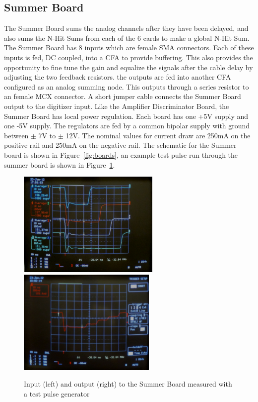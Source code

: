\documentclass{JINST}
\begin{document}
\subsection{Summer Board}
\label{sec:Sum}
%
The Summer Board sums the analog channels after they have been
delayed, and also sums the N-Hit Sums from each of the 6 cards to make
a global N-Hit Sum.  The Summer Board has 8 inputs which are female
SMA connectors.  Each of these inputs is fed, DC coupled, into a CFA
to provide buffering.  This also provides the opportunity to fine tune
the gain and equalize the signals after the cable delay by adjusting
the two feedback resistors.  the outputs are fed into another CFA
configured as an analog summing node.  This outputs through a series
resistor to an female MCX connector.  A short jumper cable connects
the Summer Board output to the digitizer input.  Like the Amplifier
Discriminator Board, the Summer Board has local power regulation.
Each board has one +5V supply and one -5V supply.  The regulators are
fed by a common bipolar supply with ground between $\pm$ 7V to $\pm$
12V.  The nominal values for current draw are 250mA on the positive
rail and 250mA on the negative rail.  The schematic for the Summer
board is shown in Figure~\ref{fig:boards}, an example test pulse run
through the summer board is shown in Figure~\ref{fig:summerpulse}.

\begin{figure}[ht]
	\begin{center}
		\includegraphics[height=2in, keepaspectratio=true]{graphics/sumpulseinput.jpg}
		\includegraphics[height=2in, keepaspectratio=true]{graphics/sumpulseoutput.jpg}
		\caption{Input (left) and output (right) to the Summer Board measured with a test pulse generator
		\label{fig:summerpulse}}
	\end{center}
\end{figure}
\end{document}
